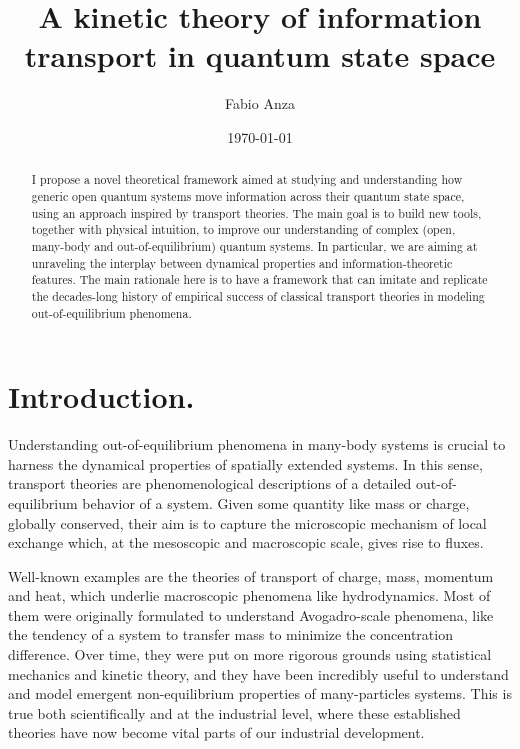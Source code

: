 \documentclass[%
 reprint,
 superscriptaddress,
 aps,
 pra,
]{revtex4-2}
\theoremstyle{definition}
\begin{document}

\title{A kinetic theory of information transport in quantum state space}

 \author{Fabio Anza}

\date{\today}


\begin{abstract}
\noindent I propose a novel theoretical framework aimed at studying and understanding how generic open quantum 
systems move information across their quantum state space, using an approach inspired by transport theories. 
The main goal is to build new tools, together with physical intuition, to improve our understanding of complex 
(open, many-body and out-of-equilibrium) quantum systems. In particular, we are aiming at unraveling the 
interplay between dynamical properties and information-theoretic features. The main rationale here is to have a 
framework that can imitate and replicate the decades-long history of empirical success of classical transport 
theories in modeling out-of-equilibrium phenomena. 
\end{abstract}

\maketitle

\section*{Introduction.} 





Understanding out-of-equilibrium phenomena in many-body systems 
is crucial to harness the dynamical properties of spatially extended systems. In this sense, transport 
theories are phenomenological descriptions of a detailed out-of-equilibrium behavior of a system. Given some
quantity like mass or charge, globally conserved, their aim is to capture the microscopic mechanism of local 
exchange which, at the mesoscopic and macroscopic scale, gives rise to fluxes.

Well-known examples are the theories of transport of charge, mass, momentum and heat, which underlie 
macroscopic phenomena like hydrodynamics. Most of them were originally formulated to understand 
Avogadro-scale phenomena, like the tendency of a system to transfer mass to minimize the concentration 
difference. Over time, they were put on more rigorous grounds using statistical mechanics and kinetic theory, 
and they have been incredibly useful to understand and model emergent non-equilibrium properties of 
many-particles systems. This is true both scientifically and at the industrial level, where these established theories 
have now become vital parts of our industrial development.
 
\end{document}
